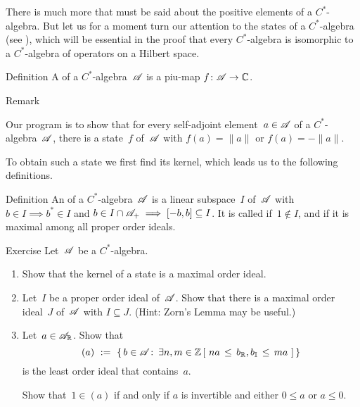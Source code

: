 \documentclass[main]{subfiles}
\begin{document}
\begin{parsec}%
\begin{point}%
There is much more that must be said
about the positive elements of a $C^*$-algebra.
But let us for a moment
turn our attention to the states of a $C^*$-algebra
(see ),
which will be
essential
in the proof that every $C^*$-algebra
is isomorphic to a $C^*$-algebra of operators on a Hilbert space.
\end{point}
\begin{point}[state]{Definition}%
A  of a $C^*$-algebra~$\mathscr{A}$
is a piu-map $f\colon \mathscr{A}\to \mathbb{C}$.
\begin{point}{Remark}%
\end{point}
\end{point}
\begin{point}
Our program is to show that 
for every self-adjoint element~$a\in \mathscr{A}$
of a $C^*$-algebra~$\mathscr{A}$,
there is a state~$f$ of~$\mathscr{A}$ with $f(a)=\|a\|$ or $f(a)=-\|a\|$.

To obtain such a state
we first find its kernel,
which leads us to the following definitions.
\end{point}
\begin{point}{Definition}%
An 
of a $C^*$-algebra~$\mathscr{A}$
is a linear subspace~$I$ of~$\mathscr{A}$
with $b\in I\implies b^*\in I$
and $b\in I\cap\mathscr{A}_{+}\implies [-b,b]\subseteq I$.
It is called  if~$1\notin I$,
and  if it is maximal among all proper order ideals.
\end{point}
\begin{point}{Exercise}%
Let~$\mathscr{A}$ be a $C^*$-algebra.
\begin{enumerate}
\item
Show that the kernel of a state is a maximal order ideal.
\item
Let~$I$ be a proper order ideal of~$\mathscr{A}$.
Show that there is a maximal 
order ideal~$J$ of~$\mathscr{A}$ with $I\subseteq J$.
(Hint: Zorn's Lemma may be useful.)
\item
Let~$a\in \mathscr{A}_{\mathbb{R}}$.
Show that 
\begin{equation*}
(a)\ := \ \{\, b\in \mathscr{A}\colon\, \exists n,m\in \mathbb{Z}\,
[\ na \,\leq\, b_{\mathbb{R}},b_{\mathbb{I}}\,\leq\, ma\ ]\,\}
\end{equation*}
is the least order ideal that contains~$a$.

Show that~$1\in (a)$ if and only if $a$ is invertible
and either $0\leq a$ or $a\leq 0$.


\end{enumerate}
\end{point}
\end{parsec}
\end{document}
